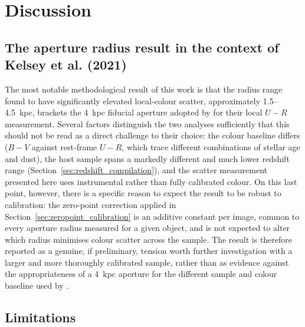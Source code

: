 \documentclass[12pt]{article}
\begin{document}
\section{Discussion}
\label{sec:discussion}

\subsection{The aperture radius result in the context of Kelsey et al. (2021)}

The most notable methodological result of this work is that the radius range found to have significantly elevated local-colour scatter, approximately 1.5--4.5~kpc, brackets the 4~kpc fiducial aperture adopted by \citet{Kelsey2021} for their local $U-R$ measurement. Several factors distinguish the two analyses sufficiently that this should not be read as a direct challenge to their choice: the colour baseline differs ($B-V$ against rest-frame $U-R$, which trace different combinations of stellar age and dust), the host sample spans a markedly different and much lower redshift range (Section~\ref{sec:redshift_compilation}), and the scatter measurement presented here uses instrumental rather than fully calibrated colour. On this last point, however, there is a specific reason to expect the result to be robust to calibration: the zero-point correction applied in Section~\ref{sec:zeropoint_calibration} is an additive constant per image, common to every aperture radius measured for a given object, and is not expected to alter which radius minimises colour scatter across the sample. The result is therefore reported as a genuine, if preliminary, tension worth further investigation with a larger and more thoroughly calibrated sample, rather than as evidence against the appropriateness of a 4~kpc aperture for the different sample and colour baseline used by \citet{Kelsey2021}.

\subsection{Limitations}
\end{document}
